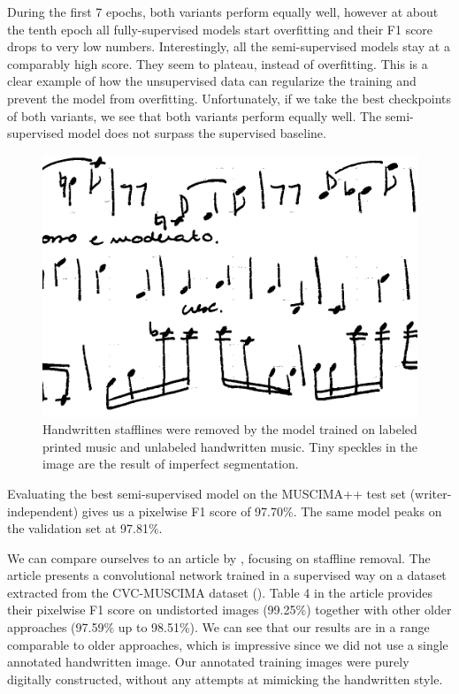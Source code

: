 During the first 7 epochs, both variants perform equally well, however at about the tenth epoch all fully-supervised models start overfitting and their F1 score drops to very low numbers. Interestingly, all the semi-supervised models stay at a comparably high score. They seem to plateau, instead of overfitting. This is a clear example of how the unsupervised data can regularize the training and prevent the model from overfitting. Unfortunately, if we take the best checkpoints of both variants, we see that both variants perform equally well. The semi-supervised model does not surpass the supervised baseline.

\begin{figure}[ht]
    \centering
    \includegraphics[width=140mm]{../../figures/04-staffline-transfer/staffline-removal.png}
    \caption{Handwritten stafflines were removed by the model trained on labeled printed music and unlabeled handwritten music. Tiny speckles in the image are the result of imperfect segmentation.}
    \label{fig:StafflineRemoval}
\end{figure}

Evaluating the best semi-supervised model on the MUSCIMA++ test set (writer-independent) gives us a pixelwise F1 score of 97.70\%. The same model peaks on the validation set at 97.81\%. 

We can compare ourselves to an article by \cite{StafflineDetection}, focusing on staffline removal. The article presents a convolutional network trained in a supervised way on a dataset extracted from the CVC-MUSCIMA dataset (\cite{CvcMuscima}). Table 4 in the article provides their pixelwise F1 score on undistorted images (99.25\%) together with other older approaches (97.59\% up to 98.51\%). We can see that our results are in a range comparable to older approaches, which is impressive since we did not use a single annotated handwritten image. Our annotated training images were purely digitally constructed, without any attempts at mimicking the handwritten style.
